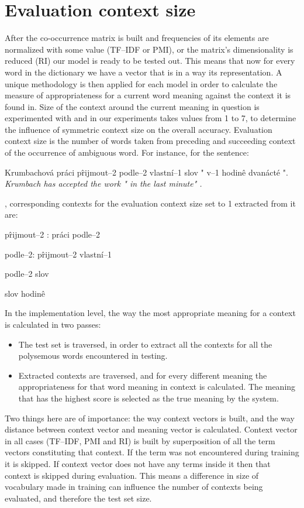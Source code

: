 \section{Evaluation context size} 
After the co-occurrence matrix is built and frequencies of its elements are normalized with some 
value (TF--IDF or PMI), or the matrix's dimensionality is reduced (RI) our model is ready to be tested out.
This means that now for every word in the dictionary we have a vector that is in a way its representation.
A unique methodology is then applied for each model in order to calculate the measure of appropriateness for a current word meaning against the context it is found in. Size of the context around the current meaning in question is experimented with and in our experiments takes values from 1 to 7, to determine the influence of symmetric context size on the overall accuracy. 
Evaluation context size is the number of words taken from preceding and succeeding context of the 
occurrence of ambiguous word. For instance, for the sentence:
\begin{examples}
\item Krumbachov\'a pr\'aci p\^rijmout--2 podle--2 vlastn\'i--1 slov " v--1 hodin\^e dvan\'act\'e ".
\glt \textit{ Krumbach has accepted the work " in the last minute"  .}
\end{examples}
, corresponding contexts for the evaluation context size set to 1 extracted from it are:
\begin{examples}
\item p\^rijmout--2 : pr\'aci  podle--2
\item  podle--2: p\^rijmout--2 vlastn\'i--1
\item podle--2 slov
\item slov  hodin\^e
\end{examples}


In the implementation level, the way the most appropriate meaning for a context is calculated in two passes:
\begin{itemize}
\item The test set is traversed, in order to extract all the contexts for all the polysemous words 
encountered  in testing.
\item Extracted contexts are traversed, and for every different meaning the appropriateness for that 
word meaning in context is calculated. The meaning that has the highest score is selected as the 
true meaning by the system.
\end{itemize}  
Two things here are of importance: the way context vectors is built, and the way distance between context vector and meaning vector is calculated. Context vector in all cases (TF--IDF, PMI and RI) is 
built by superposition of all the term vectors constituting that context. If the term was not encountered 
during training it is skipped. If context vector does not have any terms inside it then that context is skipped during evaluation. This means a difference in size of vocabulary made in training can influence the number
of contexts being evaluated, and therefore the test set size. 

